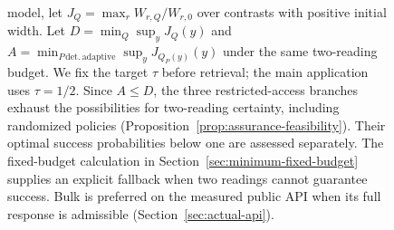 \begin{figure}[htbp]
{model, let $J_Q=\max_r W_{r,Q}/W_{r,0}$ over contrasts with positive initial
width. Let $D=\min_Q\sup_y J_Q(y)$ and
$A=\min_{P\,\mathrm{det.\ adaptive}}\sup_y J_{Q_P(y)}(y)$ under the same
two-reading budget. We fix the target $\tau$ before retrieval; the main
application uses $\tau=1/2$. Since $A\leq D$, the three restricted-access
branches exhaust the possibilities for two-reading certainty, including randomized
policies (Proposition~\ref{prop:assurance-feasibility}). Their optimal
success probabilities below one are assessed separately. The fixed-budget
calculation in Section~\ref{sec:minimum-fixed-budget} supplies an explicit
fallback when two readings cannot guarantee success. Bulk is preferred on the measured public
API when its full response is admissible (Section~\ref{sec:actual-api}).}
\label{fig:audit-workflow}
\end{figure}
